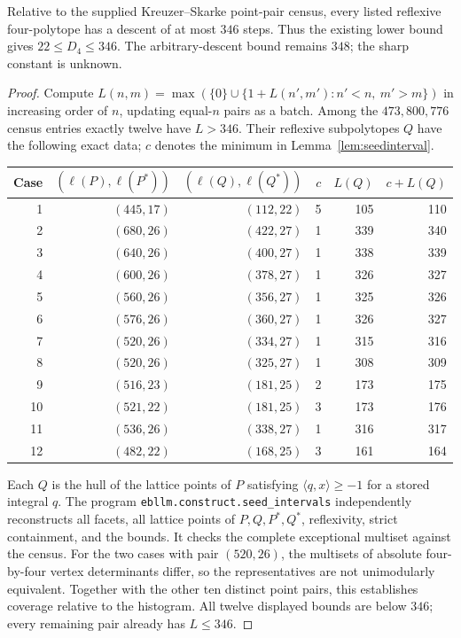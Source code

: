 \begin{corollary}\label{cor:seed346}
Relative to the supplied Kreuzer--Skarke point-pair census, every
listed reflexive four-polytope has a descent of at most $346$ steps.
Thus the existing lower bound gives $22\le D_4\le346$.
The arbitrary-descent bound remains $348$; the sharp constant is unknown.
\end{corollary}
\begin{proof}
Compute $L(n,m)=\max(\{0\}\cup\{1+L(n',m'):n'<n,\ m'>m\})$
in increasing order of $n$, updating equal-$n$ pairs as a batch.
Among the $473{,}800{,}776$ census entries exactly twelve have $L>346$.
Their reflexive subpolytopes $Q$ have the following exact data;
$c$ denotes the minimum in Lemma~\ref{lem:seedinterval}.
\begin{center}\small
\begin{tabular}{rrrrrr}\toprule
Case & $(\ell(P),\ell(P^*))$ & $(\ell(Q),\ell(Q^*))$ & $c$ & $L(Q)$ & $c+L(Q)$\\
\midrule
1 & $(445,17)$ & $(112,22)$ & 5 & 105 & 110\\
2 & $(680,26)$ & $(422,27)$ & 1 & 339 & 340\\
3 & $(640,26)$ & $(400,27)$ & 1 & 338 & 339\\
4 & $(600,26)$ & $(378,27)$ & 1 & 326 & 327\\
5 & $(560,26)$ & $(356,27)$ & 1 & 325 & 326\\
6 & $(576,26)$ & $(360,27)$ & 1 & 326 & 327\\
7 & $(520,26)$ & $(334,27)$ & 1 & 315 & 316\\
8 & $(520,26)$ & $(325,27)$ & 1 & 308 & 309\\
9 & $(516,23)$ & $(181,25)$ & 2 & 173 & 175\\
10 & $(521,22)$ & $(181,25)$ & 3 & 173 & 176\\
11 & $(536,26)$ & $(338,27)$ & 1 & 316 & 317\\
12 & $(482,22)$ & $(168,25)$ & 3 & 161 & 164\\
\bottomrule\end{tabular}\end{center}
Each $Q$ is the hull of the lattice points of $P$ satisfying
$\langle q,x\rangle\ge-1$ for a stored integral $q$. The program
\texttt{ebllm.construct.seed\_intervals} independently reconstructs all
facets, all lattice points of $P,Q,P^*,Q^*$, reflexivity, strict
containment, and the bounds. It checks the complete exceptional
multiset against the census. For the two cases with pair $(520,26)$,
the multisets of absolute four-by-four vertex determinants differ,
so the representatives are not unimodularly equivalent. Together
with the other ten distinct point pairs, this establishes coverage
relative to the histogram. All twelve displayed bounds are below
$346$; every remaining pair already has $L\le346$.
\end{proof}

